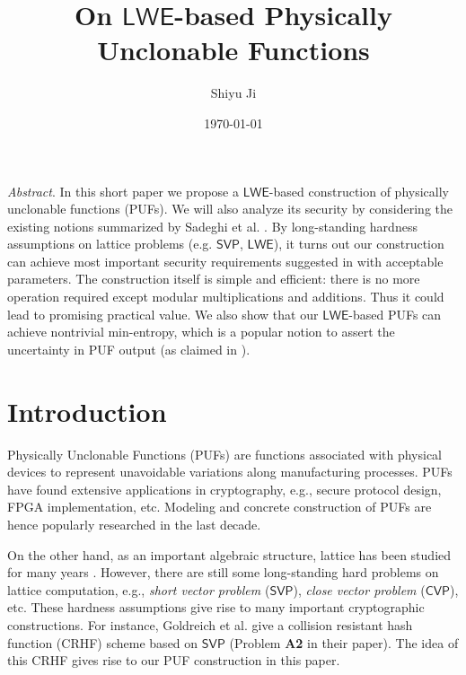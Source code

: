 \documentclass[12pt]{article}
\newcommand{\SVP}{\mathsf{SVP}}
\newcommand{\CVP}{\mathsf{CVP}}
\newcommand{\LWE}{\mathsf{LWE}}
\theoremstyle{definition}
\begin{document}
\title{On $\LWE$-based Physically Unclonable Functions}
\author{Shiyu Ji}
\date{\today}
\maketitle

{\it Abstract}. 
In this short paper we propose a $\LWE$-based construction of physically unclonable functions (PUFs). We will also analyze its security by considering the existing notions summarized by Sadeghi et al. \cite{sadeghi2016towards}. By long-standing hardness assumptions on lattice problems (e.g. $\SVP$, $\LWE$), it turns out our construction can achieve most important security requirements suggested in \cite{sadeghi2016towards} with acceptable parameters. The construction itself is simple and efficient: there is no more operation required except modular multiplications and additions. Thus it could lead to promising practical value. We also show that our $\LWE$-based PUFs can achieve nontrivial min-entropy, which is a popular notion to assert the uncertainty in PUF output (as claimed in \cite{sadeghi2016towards}).

\section{Introduction}
Physically Unclonable Functions (PUFs) are functions associated with physical devices to represent unavoidable variations along manufacturing processes. PUFs have found extensive applications in cryptography, e.g., secure protocol design, FPGA implementation, etc. \cite{sadeghi2016towards} Modeling and concrete construction of PUFs are hence popularly researched in the last decade.

On the other hand, as an important algebraic structure, lattice has been studied for many years \cite{regev2009lattices}. However, there are still some long-standing hard problems on lattice computation, e.g., \emph{short vector problem} ($\SVP$), \emph{close vector problem} ($\CVP$), etc. These hardness assumptions give rise to many important cryptographic constructions. For instance, Goldreich et al. \cite{goldreich2011collision} give a collision resistant hash function (CRHF) scheme based on $\SVP$ (Problem {\bf A2} in their paper). The idea of this CRHF gives rise to our PUF construction in this paper.
\end{document}
